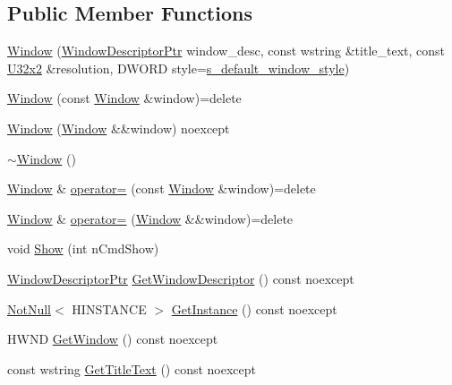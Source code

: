 \subsection*{Public Member Functions}
\begin{DoxyCompactItemize}
\item 
\hyperlink{classmage_1_1_window_a0ac19cbc7adf4aa0ed39e29244a65b57}{Window} (\hyperlink{classmage_1_1_window_ac41b052d8e8dd0571b3ec862e8f6da05}{Window\+Descriptor\+Ptr} window\+\_\+desc, const wstring \&title\+\_\+text, const \hyperlink{namespacemage_a88e05bff0300120c013285d3dcad95c5}{U32x2} \&resolution, D\+W\+O\+RD style=\hyperlink{classmage_1_1_window_ac680bdd3d5359f66b2dea082ef45e0da}{s\+\_\+default\+\_\+window\+\_\+style})
\item 
\hyperlink{classmage_1_1_window_a910a63ff907559e693cb9abd3539523e}{Window} (const \hyperlink{classmage_1_1_window}{Window} \&window)=delete
\item 
\hyperlink{classmage_1_1_window_a32878487dd2e2f46eaaf97aaf220ee33}{Window} (\hyperlink{classmage_1_1_window}{Window} \&\&window) noexcept
\item 
\hyperlink{classmage_1_1_window_a71d3ce0b3141e89121ae09e8fc64a217}{$\sim$\+Window} ()
\item 
\hyperlink{classmage_1_1_window}{Window} \& \hyperlink{classmage_1_1_window_ab62aeec5dee0c36b9926894e2684ff3d}{operator=} (const \hyperlink{classmage_1_1_window}{Window} \&window)=delete
\item 
\hyperlink{classmage_1_1_window}{Window} \& \hyperlink{classmage_1_1_window_aa52284540a75c98a2aa768a5d6410378}{operator=} (\hyperlink{classmage_1_1_window}{Window} \&\&window)=delete
\item 
void \hyperlink{classmage_1_1_window_a017de58a756a2cc4dde0ccb3caf589ff}{Show} (int n\+Cmd\+Show)
\item 
\hyperlink{classmage_1_1_window_ac41b052d8e8dd0571b3ec862e8f6da05}{Window\+Descriptor\+Ptr} \hyperlink{classmage_1_1_window_add5b20d191810ba04000728c7517543f}{Get\+Window\+Descriptor} () const noexcept
\item 
\hyperlink{namespacemage_a8769f9d670d6b585ea306cb1062af94b}{Not\+Null}$<$ H\+I\+N\+S\+T\+A\+N\+CE $>$ \hyperlink{classmage_1_1_window_a809eff149af9fd2e66eec176078d0127}{Get\+Instance} () const noexcept
\item 
H\+W\+ND \hyperlink{classmage_1_1_window_a0f791c3fb8f5be34a17ae2a93767a613}{Get\+Window} () const noexcept
\item 
const wstring \hyperlink{classmage_1_1_window_a62bf5cd2d9dbdf53947cec3cccee04db}{Get\+Title\+Text} () const noexcept

\end{DoxyCompactItemize}
